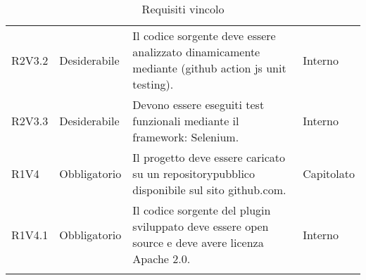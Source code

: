 \begin{longtable} {
		>{\centering}p{18mm} 
		>{\centering}p{28mm}
		>{}p{50mm} 
		>{}p{28mm}
		}
	R2V3.2 &
	Desiderabile &
	Il codice sorgente deve essere analizzato dinamicamente mediante (github action js unit testing). &
	Interno  \TBstrut \\ [2mm]
	
	R2V3.3 &
	Desiderabile &
	Devono essere eseguiti test funzionali mediante il framework: Selenium. &
	Interno  \TBstrut \\ [2mm]
	
	R1V4 & 
	Obbligatorio & 
	Il progetto deve essere caricato su un repository\glosp pubblico disponibile sul sito github.com. &
	Capitolato  \TBstrut \\ [2mm]
	
	R1V4.1 & 
	Obbligatorio & 
	Il codice sorgente del plugin sviluppato deve essere open source e deve avere licenza Apache 2.0\glo .  &
	Interno  \TBstrut \\ [2mm]
	\rowcolor{white}
	\caption{Requisiti vincolo}
\end{longtable}
